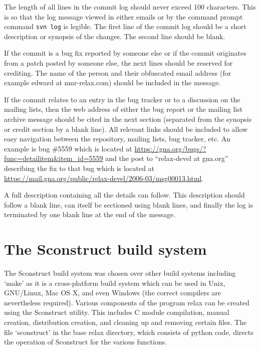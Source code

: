 The length of all lines in the commit log should never exceed 100 characters.  This is so that the log message viewed in either emails or by the command prompt command \mbox{\texttt{svn log}} is legible.  The first line of the commit log should be a short description or synopsis of the changes.  The second line should be blank.

If the commit is a bug fix reported by someone else or if the commit originates from a patch posted by someone else, the next lines should be reserved for crediting.  The name of the person and their obfuscated email address (for example edward at nmr-relax.com) should be included in the message.

If the commit relates to an entry in the bug tracker or to a discussion on the mailing lists, then the web address of either the bug report or the mailing list archive message should be cited in the next section (separated from the synopsis or credit section by a blank line).  All relevant links should be included to allow easy navigation between the repository, mailing lists, bug tracker, etc.  An example is bug \#5559 which is located at \href{https://gna.org/bugs/?func=detailitem\&item\_id=5559}{https://gna.org/bugs/?func=detailitem\&item\_id=5559} and the post to ``relax-devel at gna.org'' describing the fix to that bug which is located at \href{https://mail.gna.org/public/relax-devel/2006-03/msg00013.html}{https://mail.gna.org/public/relax-devel/2006-03/msg00013.html}.

A full description containing all the details can follow.  This description should follow a blank line, can itself be sectioned using blank lines, and finally the log is terminated by one blank line at the end of the message.




\section{The Sconstruct build system}

The Sconstruct build system was chosen over other build systems including `make' as it is a cross-platform build system which can be used in Unix, GNU/Linux, Mac OS X, and even Windows (the correct compilers are nevertheless required).  Various components of the program relax can be created using the Sconstruct utility.  This includes C module compilation, manual creation, distribution creation, and cleaning up and removing certain files.  The file `sconstruct' in the base relax directory, which consists of python code, directs the operation of Sconstruct for the various functions.


